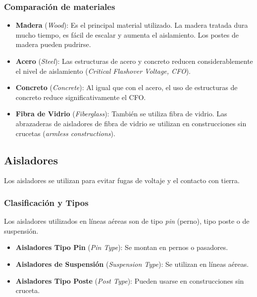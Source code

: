 \subsubsection*{Comparación de materiales}
\begin{itemize}
    \item \textbf{Madera} (\textit{Wood}): Es el principal material utilizado. La madera tratada dura mucho tiempo, es fácil de escalar y aumenta el aislamiento. Los postes de madera pueden pudrirse.
    \item \textbf{Acero} (\textit{Steel}): Las estructuras de acero y concreto reducen considerablemente el nivel de aislamiento (\textit{Critical Flashover Voltage, CFO}).
    \item \textbf{Concreto} (\textit{Concrete}): Al igual que con el acero, el uso de estructuras de concreto reduce significativamente el CFO.
    \item \textbf{Fibra de Vidrio} (\textit{Fiberglass}): También se utiliza fibra de vidrio. Las abrazaderas de aisladores de fibra de vidrio se utilizan en construcciones sin crucetas (\textit{armless constructions}).
\end{itemize}

\subsection*{Aisladores}
Los aisladores se utilizan para evitar fugas de voltaje y el contacto con tierra.

\subsubsection*{Clasificación y Tipos}
Los aisladores utilizados en líneas aéreas son de tipo \textit{pin} (perno), tipo poste o de suspensión.
\begin{itemize}
    \item \textbf{Aisladores Tipo Pin} (\textit{Pin Type}): Se montan en pernos o pasadores.
    \item \textbf{Aisladores de Suspensión} (\textit{Suspension Type}): Se utilizan en líneas aéreas.
    \item \textbf{Aisladores Tipo Poste} (\textit{Post Type}): Pueden usarse en construcciones sin cruceta.
\end{itemize}


